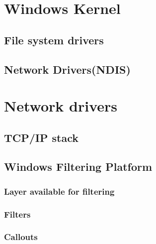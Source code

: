 \section{Windows Kernel}
\subsection{File system drivers}
\subsection{Network Drivers(NDIS)}
\section{Network drivers}
\subsection{TCP/IP stack}
\subsection{Windows Filtering Platform}
\subsubsection{Layer available for filtering}
\subsubsection{Filters}
\subsubsection{Callouts}

